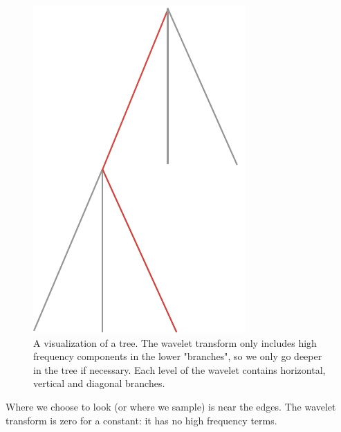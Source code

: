 \documentclass{article}
\begin{document}
            \begin{figure}
            	\hspace{8em}
                \includegraphics[angle=90]{tree}
                \caption{A visualization of a tree. The wavelet transform only includes high frequency components in the lower "branches", so we only go deeper in the tree if necessary. Each level of the wavelet contains horizontal, vertical and diagonal branches. }
                \label{fig:tree}
            \end{figure}
            
            Where we choose to look (or where we sample) is near the edges. The wavelet transform is zero for a constant: it has no high frequency terms.
\end{document}
